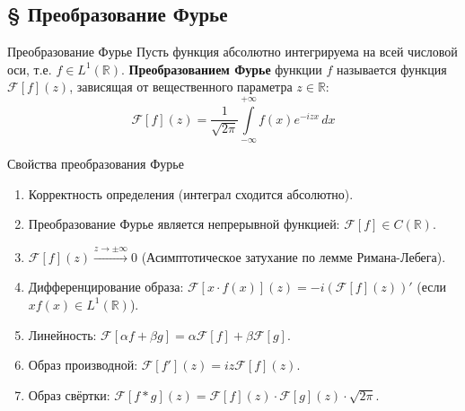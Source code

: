\documentclass[12pt,a4paper]{article}
\begin{document}
\subsection{§ Преобразование Фурье}

\begin{Definition}{Преобразование Фурье}{}
Пусть функция абсолютно интегрируема на всей числовой оси, т.е. $f \in L^1(\mathbb{R})$. \textbf{Преобразованием Фурье} функции $f$ называется функция $\mathcal{F}[f](z)$, зависящая от вещественного параметра $z \in \mathbb{R}$:
$$ \mathcal{F}[f](z) = \frac{1}{\sqrt{2\pi}} \int\limits_{-\infty}^{+\infty} f(x) e^{-i z x} \, dx $$
\end{Definition}

\begin{Theorem}{Свойства преобразования Фурье}{}
\begin{enumerate}
    \item Корректность определения (интеграл сходится абсолютно).
    \item Преобразование Фурье является непрерывной функцией: $\mathcal{F}[f] \in C(\mathbb{R})$.
    \item $\mathcal{F}[f](z) \xrightarrow{z \to \pm\infty} 0$ (Асимптотическое затухание по лемме Римана-Лебега).
    \item Дифференцирование образа: $\mathcal{F}[x \cdot f(x)](z) = -i \left( \mathcal{F}[f](z) \right)'$ (если $x f(x) \in L^1(\mathbb{R})$).
    \item Линейность: $\mathcal{F}[\alpha f + \beta g] = \alpha\mathcal{F}[f] + \beta\mathcal{F}[g]$.
    \item Образ производной: $\mathcal{F}[f'](z) = i z \mathcal{F}[f](z)$.
    \item Образ свёртки: $\mathcal{F}[f * g](z) = \mathcal{F}[f](z) \cdot \mathcal{F}[g](z) \cdot \sqrt{2\pi}$.
\end{enumerate}
\end{Theorem}
\end{document}

